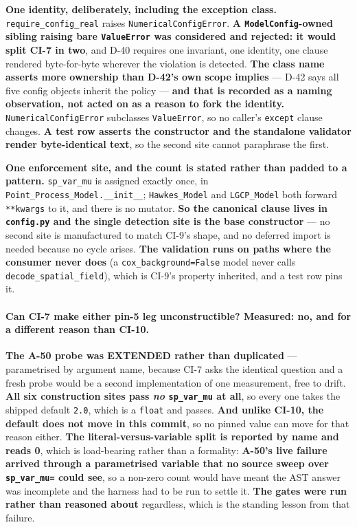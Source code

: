 \documentclass[
  10pt,
]{article}
\begin{document}
\textbf{One identity, deliberately, including the exception class.} \texttt{require\_config\_real} raises \texttt{NumericalConfigError}. \textbf{A \texttt{ModelConfig}-owned sibling raising bare \texttt{ValueError} was considered and rejected: it would split CI-7 in two}, and D-40 requires one invariant, one identity, one clause rendered byte-for-byte wherever the violation is detected. \textbf{The class name asserts more ownership than D-42's own scope implies} --- D-42 says all five config objects inherit the policy --- \textbf{and that is recorded as a naming observation, not acted on as a reason to fork the identity.} \texttt{NumericalConfigError} subclasses \texttt{ValueError}, so no caller's \texttt{except} clause changes. \textbf{A test row asserts the constructor and the standalone validator render byte-identical text}, so the second site cannot paraphrase the first.

\textbf{One enforcement site, and the count is stated rather than padded to a pattern.} \texttt{sp\_var\_mu} is assigned exactly once, in \texttt{Point\_Process\_Model.\_\_init\_\_}; \texttt{Hawkes\_Model} and \texttt{LGCP\_Model} both forward \texttt{**kwargs} to it, and there is no mutator. \textbf{So the canonical clause lives in \texttt{config.py} and the single detection site is the base constructor} --- no second site is manufactured to match CI-9's shape, and no deferred import is needed because no cycle arises. \textbf{The validation runs on paths where the consumer never does} (a \texttt{cox\_background=False} model never calls \texttt{decode\_spatial\_field}), which is CI-9's property inherited, and a test row pins it.

\paragraph{Can CI-7 make either pin-5 leg unconstructible? Measured: no, and for a different reason than CI-10.}
\textbf{The A-50 probe was EXTENDED rather than duplicated} --- parametrised by argument name, because CI-7 asks the identical question and a fresh probe would be a second implementation of one measurement, free to drift. \textbf{All six construction sites pass \emph{no} \texttt{sp\_var\_mu} at all}, so every one takes the shipped default \texttt{2.0}, which is a \texttt{float} and passes. \textbf{And unlike CI-10, the default does not move in this commit}, so no pinned value can move for that reason either. \textbf{The literal-versus-variable split is reported by name and reads 0}, which is load-bearing rather than a formality: \textbf{A-50's live failure arrived through a parametrised variable that no source sweep over \texttt{sp\_var\_mu=} could see}, so a non-zero count would have meant the AST answer was incomplete and the harness had to be run to settle it. \textbf{The gates were run rather than reasoned about} regardless, which is the standing lesson from that failure.
\end{document}
